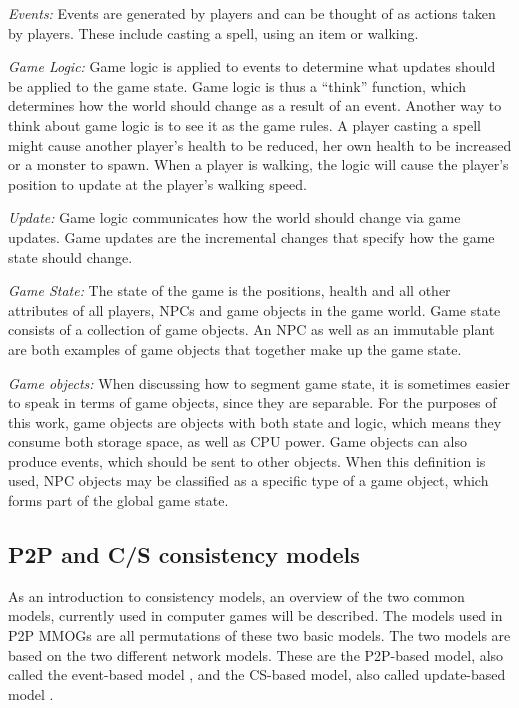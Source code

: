 \documentclass[10pt,a4paper,journal,cspaper,compsoc]{IEEEtran}
\begin{document}
\emph{Events:} Events are generated by players and can be thought of as actions taken by players. These include casting a spell, using an item
    or walking.

\emph{Game Logic:} Game logic is applied to events to determine what updates should be applied to the game state. Game logic is thus a
    ``think'' function, which determines how the world should change as a result of an event. Another way to think about game logic is to see
    it as the game rules. A player casting a spell might cause another player's health to be reduced, her own health to be increased or a
    monster to spawn. When a player is walking, the logic will cause the player's position to update at the player's walking speed.

\emph{Update:} Game logic communicates how the world should change via game updates. Game updates are the incremental changes that specify how
    the game state should change.

\emph{Game State:} The state of the game is the positions, health and all other attributes of all players, \acp{NPC} and game objects in the game
    world. Game state consists of a collection of game objects. An \ac{NPC} as well as an immutable plant are both examples of game objects that
    together make up the game state.

\emph{Game objects:} When discussing how to segment game state, it is sometimes easier to speak in terms of game objects, since they are
    separable. For the purposes of this work, game objects are objects with both state and logic, which means they consume both storage
    space, as well as CPU power. Game objects can also produce events, which should be sent to other objects. When this definition is used,
    NPC objects may be classified as a specific type of a game object, which forms part of the global game state.

\subsection{P2P and C/S consistency models}
\label{p2p_cs_models}

As an introduction to consistency models, an overview of the two common models, currently used in computer games will be described. The models used
in P2P MMOGs are all permutations of these two basic models. The two models are based on the two different network models. These are the P2P-based
model, also called the event-based model \cite{p2p_cm_aoe}, and the \ac{CS}-based model, also called update-based model \cite{unreal_networking}.
\end{document}

